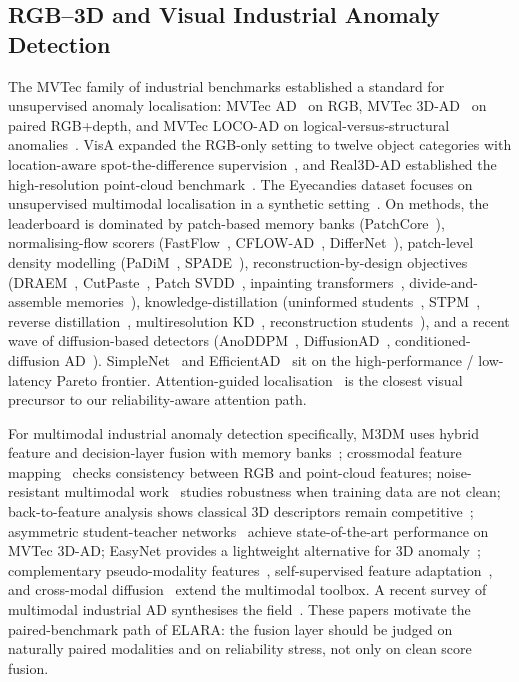 \documentclass[10pt,conference]{IEEEtran}
\newcommand{\system}{ELARA}
\begin{document}
\subsection{RGB--3D and Visual Industrial Anomaly Detection}
The MVTec family of industrial benchmarks established a standard for
unsupervised anomaly localisation: MVTec AD~\cite{bergmann2019mvtec} on RGB,
MVTec 3D-AD~\cite{bergmann2022mvtec3d} on paired RGB+depth, and MVTec LOCO-AD
on logical-versus-structural anomalies~\cite{bergmann2023logical}. VisA
expanded the RGB-only setting to twelve object categories with
location-aware spot-the-difference supervision~\cite{zou2022visa}, and
Real3D-AD established the high-resolution point-cloud
benchmark~\cite{liu2023real3dad}. The Eyecandies dataset focuses on
unsupervised multimodal localisation in a synthetic
setting~\cite{bonfiglioli2022eyecandies}. On methods, the leaderboard is
dominated by patch-based memory banks (PatchCore~\cite{roth2022patchcore}),
normalising-flow scorers (FastFlow~\cite{yu2021fastflow},
CFLOW-AD~\cite{gudovskiy2022cflow}, DifferNet~\cite{rudolph2021same}),
patch-level density modelling
(PaDiM~\cite{defard2021padim}, SPADE~\cite{cohen2020spade}),
reconstruction-by-design objectives
(DRAEM~\cite{zavrtanik2021draem}, CutPaste~\cite{li2021cutpaste},
Patch SVDD~\cite{yi2020patchsvdd},
inpainting transformers~\cite{pirnay2022inpainting},
divide-and-assemble memories~\cite{hou2021divide}),
knowledge-distillation
(uninformed students~\cite{bergmann2020uninformed},
STPM~\cite{wang2021stpm},
reverse distillation~\cite{deng2022rd4ad},
multiresolution KD~\cite{salehi2021multiresolution},
reconstruction students~\cite{yamada2022reconstruction}),
and a recent wave of diffusion-based detectors
(AnoDDPM~\cite{wyatt2022anoddpm},
DiffusionAD~\cite{zhang2023diffusionad},
conditioned-diffusion AD~\cite{mousakhan2024anomaly}).
SimpleNet~\cite{liu2023simplenet} and EfficientAD~\cite{batzner2024efficientad}
sit on the high-performance / low-latency Pareto frontier. Attention-guided
localisation~\cite{venkataramanan2020attention} is the closest visual
precursor to our reliability-aware attention path.

For multimodal industrial anomaly detection specifically, M3DM uses hybrid
feature and decision-layer fusion with memory
banks~\cite{wang2023m3dm}; crossmodal feature
mapping~\cite{costanzino2023crossmodal} checks consistency between RGB and
point-cloud features; noise-resistant multimodal
work~\cite{wang2024m3dmnr} studies robustness when training data are not
clean; back-to-feature analysis shows classical 3D descriptors remain
competitive~\cite{horwitz2023btf}; asymmetric student-teacher
networks~\cite{rudolph2023ast} achieve state-of-the-art performance on
MVTec 3D-AD; EasyNet provides a lightweight alternative for 3D
anomaly~\cite{chen2023easynet}; complementary pseudo-modality
features~\cite{cao2023rgbpc}, self-supervised feature
adaptation~\cite{tu2024self}, and cross-modal diffusion~\cite{li2023rgbd}
extend the multimodal toolbox. A recent survey of multimodal industrial AD
synthesises the field~\cite{wang2024multimodal}. These papers motivate the
paired-benchmark path of \system{}: the fusion layer should be judged on
naturally paired modalities and on reliability stress, not only on clean
score fusion.
\end{document}
